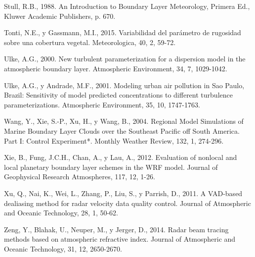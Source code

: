 \documentclass[12pt,spanish,oneside]{book}
\begin{document}
\hypertarget{ref-Stull1988}{}
Stull, R.B., 1988. An Introduction to Boundary Layer Meteorology,
Primera Ed., Kluwer Academic Publishers, p. 670.

\hypertarget{ref-Tonti2015}{}
Tonti, N.E., y Gassmann, M.I., 2015. Variabilidad del parámetro de
rugosidad sobre una cobertura vegetal. Meteorologica, 40, 2, 59-72.

\hypertarget{ref-Ulke2000}{}
Ulke, A.G., 2000. New turbulent parameterization for a dispersion model
in the atmospheric boundary layer. Atmospheric Environment, 34, 7,
1029-1042.

\hypertarget{ref-Ulke2001}{}
Ulke, A.G., y Andrade, M.F., 2001. Modeling urban air pollution in Sao
Paulo, Brazil: Sensitivity of model predicted concentrations to
different turbulence parameterizations. Atmospheric Environment, 35, 10,
1747-1763.

\hypertarget{ref-Wang2004}{}
Wang, Y., Xie, S.-P., Xu, H., y Wang, B., 2004. Regional Model
Simulations of Marine Boundary Layer Clouds over the Southeast Pacific
off South America. Part I: Control Experiment*. Monthly Weather Review,
132, 1, 274-296.

\hypertarget{ref-Xie2012}{}
Xie, B., Fung, J.C.H., Chan, A., y Lau, A., 2012. Evaluation of nonlocal
and local planetary boundary layer schemes in the WRF model. Journal of
Geophysical Research Atmospheres, 117, 12, 1-26.

\hypertarget{ref-Xu2011}{}
Xu, Q., Nai, K., Wei, L., Zhang, P., Liu, S., y Parrish, D., 2011. A
VAD-based dealiasing method for radar velocity data quality control.
Journal of Atmospheric and Oceanic Technology, 28, 1, 50-62.

\hypertarget{ref-Zeng2014}{}
Zeng, Y., Blahak, U., Neuper, M., y Jerger, D., 2014. Radar beam tracing
methods based on atmospheric refractive index. Journal of Atmospheric
and Oceanic Technology, 31, 12, 2650-2670.
\end{document}
